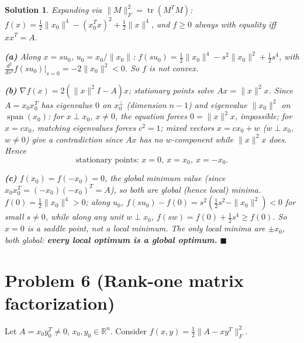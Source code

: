 \documentclass[11pt]{article}
\newcommand{\R}{\mathbb{R}}
\newcommand{\tr}{\operatorname{tr}}
\newtheorem*{solution}{Solution}
\begin{document}
\begin{solution}
Expanding via $\|M\|_F^2=\tr(M^TM)$: $f(x) = \tfrac12\|x_0\|^4-(x_0^Tx)^2+\tfrac12\|x\|^4$, and $f\ge0$ always with equality iff $xx^T=A$.

\textbf{(a)} Along $x=su_0$, $u_0=x_0/\|x_0\|$: $f(su_0)=\tfrac12\|x_0\|^4-s^2\|x_0\|^2+\tfrac12s^4$, with $\frac{d^2}{ds^2}f(su_0)\big|_{s=0}=-2\|x_0\|^2<0$. So $f$ is not convex.

\textbf{(b)} $\nabla f(x)=2(\|x\|^2I-A)x$; stationary points solve $Ax=\|x\|^2x$. Since $A=x_0x_0^T$ has eigenvalue $0$ on $x_0^\perp$ (dimension $n-1$) and eigenvalue $\|x_0\|^2$ on $\operatorname{span}(x_0)$: for $x\perp x_0$, $x\ne0$, the equation forces $0=\|x\|^2x$, impossible; for $x=cx_0$, matching eigenvalues forces $c^2=1$; mixed vectors $x=cx_0+w$ ($w\perp x_0$, $w\ne0$) give a contradiction since $Ax$ has no $w$-component while $\|x\|^2x$ does. Hence
\[
\text{stationary points: } x=0,\ x=x_0,\ x=-x_0.
\]

\textbf{(c)} $f(x_0)=f(-x_0)=0$, the global minimum value (since $x_0x_0^T=(-x_0)(-x_0)^T=A$), so both are global (hence local) minima. $f(0)=\tfrac12\|x_0\|^4>0$; along $u_0$, $f(su_0)-f(0)=s^2(\tfrac12s^2-\|x_0\|^2)<0$ for small $s\ne0$, while along any unit $w\perp x_0$, $f(sw)=f(0)+\tfrac12s^4\ge f(0)$. So $x=0$ is a saddle point, not a local minimum. The only local minima are $\pm x_0$, both global: \textbf{every local optimum is a global optimum.} $\blacksquare$
\end{solution}

\section*{Problem 6 (Rank-one matrix factorization)}

Let $A=x_0y_0^T\ne0$, $x_0,y_0\in\R^n$. Consider $f(x,y)=\tfrac12\|A-xy^T\|_F^2$.
\end{document}
